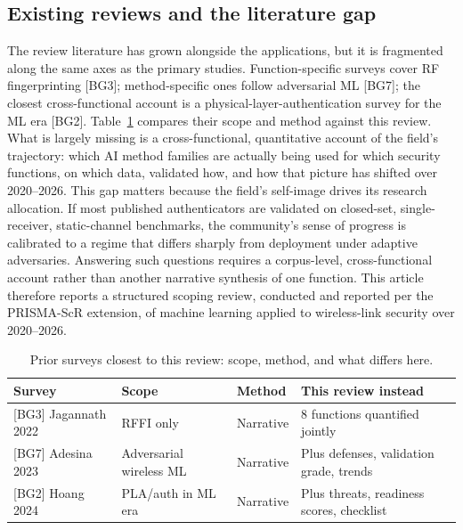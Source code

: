 \documentclass[11pt,a4paper]{article}
\begin{document}
\subsection{Existing reviews and the literature gap}
The review literature has grown alongside the applications, but it is fragmented along the same axes as the primary studies. Function-specific surveys cover RF fingerprinting [BG3]; method-specific ones follow adversarial ML [BG7]; the closest cross-functional account is a physical-layer-authentication survey for the ML era [BG2]. Table~\ref{tab:priors} compares their scope and method against this review. What is largely missing is a cross-functional, quantitative account of the field's trajectory: which AI method families are actually being used for which security functions, on which data, validated how, and how that picture has shifted over 2020--2026. This gap matters because the field's self-image drives its research allocation. If most published authenticators are validated on closed-set, single-receiver, static-channel benchmarks, the community's sense of progress is calibrated to a regime that differs sharply from deployment under adaptive adversaries. Answering such questions requires a corpus-level, cross-functional account rather than another narrative synthesis of one function. This article therefore reports a structured scoping review, conducted and reported per the PRISMA-ScR extension, of machine learning applied to wireless-link security over 2020--2026.

\begin{table}[tbp]
\centering
\footnotesize
\caption{Prior surveys closest to this review: scope, method, and what differs here.}
\label{tab:priors}
\begin{tabular}{@{}l p{3.6cm} p{2.6cm} p{5.2cm}@{}}
\toprule
Survey & Scope & Method & This review instead \\
\midrule
{[BG3]} Jagannath 2022 & RFFI only & Narrative & 8 functions quantified jointly \\
{[BG7]} Adesina 2023 & Adversarial wireless ML & Narrative & Plus defenses, validation grade, trends \\
{[BG2]} Hoang 2024 & PLA/auth in ML era & Narrative & Plus threats, readiness scores, checklist \\
\bottomrule
\end{tabular}
\end{table}
\end{document}
